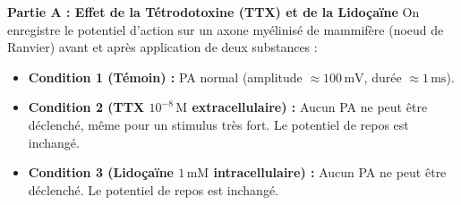 \documentclass[11pt]{article}
\begin{document}
\begin{exercice}
\textbf{Partie A : Effet de la Tétrodotoxine (TTX) et de la Lidoçaïne}
On enregistre le potentiel d'action sur un axone myélinisé de mammifère (noeud de Ranvier) avant et après application de deux substances :
\begin{itemize}
\item \textbf{Condition 1 (Témoin) :} PA normal (amplitude $\approx 100\,\text{mV}$, durée $\approx 1\,\text{ms}$).
\item \textbf{Condition 2 (TTX $10^{-8}\,\text{M}$ extracellulaire) :} Aucun PA ne peut être déclenché, même pour un stimulus très fort. Le potentiel de repos est inchangé.
\item \textbf{Condition 3 (Lidoçaïne $1\,\text{mM}$ intracellulaire) :} Aucun PA ne peut être déclenché. Le potentiel de repos est inchangé.
\end{itemize}


\end{exercice}
\end{document}
